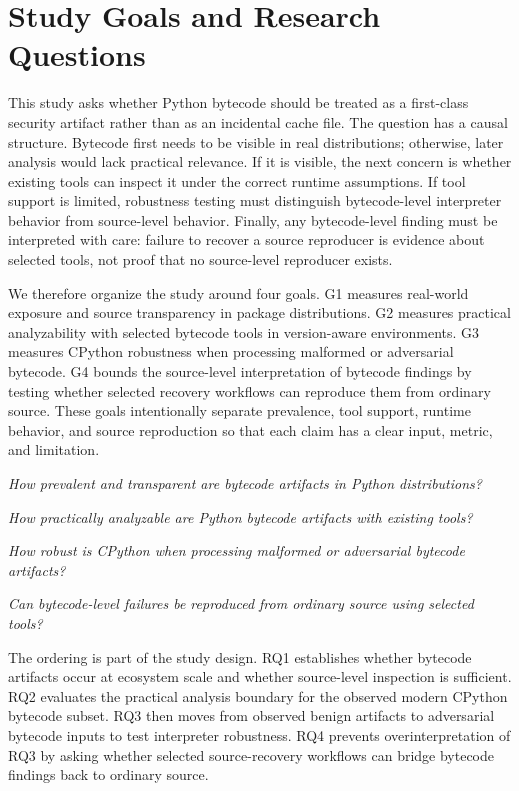 
\section{Study Goals and Research Questions}\label{sec:study}

This study asks whether Python bytecode should be treated as a first-class security artifact rather than as an incidental cache file.  The question has a causal structure.  Bytecode first needs to be visible in real distributions; otherwise, later analysis would lack practical relevance.  If it is visible, the next concern is whether existing tools can inspect it under the correct runtime assumptions.  If tool support is limited, robustness testing must distinguish bytecode-level interpreter behavior from source-level behavior.  Finally, any bytecode-level finding must be interpreted with care: failure to recover a source reproducer is evidence about selected tools, not proof that no source-level reproducer exists.

We therefore organize the study around four goals.  G1 measures real-world exposure and source transparency in package distributions.  G2 measures practical analyzability with selected bytecode tools in version-aware environments.  G3 measures CPython robustness when processing malformed or adversarial bytecode.  G4 bounds the source-level interpretation of bytecode findings by testing whether selected recovery workflows can reproduce them from ordinary source.  These goals intentionally separate prevalence, tool support, runtime behavior, and source reproduction so that each claim has a clear input, metric, and limitation.

\begin{description}[style=unboxed,leftmargin=0cm]
\denseitems
\item[\textbf{RQ1 (G1):}] \emph{How prevalent and transparent are bytecode artifacts in Python distributions?}
\item[\textbf{RQ2 (G2):}] \emph{How practically analyzable are Python bytecode artifacts with existing tools?}
\item[\textbf{RQ3 (G3):}] \emph{How robust is CPython when processing malformed or adversarial bytecode artifacts?}
\item[\textbf{RQ4 (G4):}] \emph{Can bytecode-level failures be reproduced from ordinary source using selected tools?}
\end{description}

The ordering is part of the study design.  RQ1 establishes whether bytecode artifacts occur at ecosystem scale and whether source-level inspection is sufficient.  RQ2 evaluates the practical analysis boundary for the observed modern CPython bytecode subset.  RQ3 then moves from observed benign artifacts to adversarial bytecode inputs to test interpreter robustness.  RQ4 prevents overinterpretation of RQ3 by asking whether selected source-recovery workflows can bridge bytecode findings back to ordinary source.  


